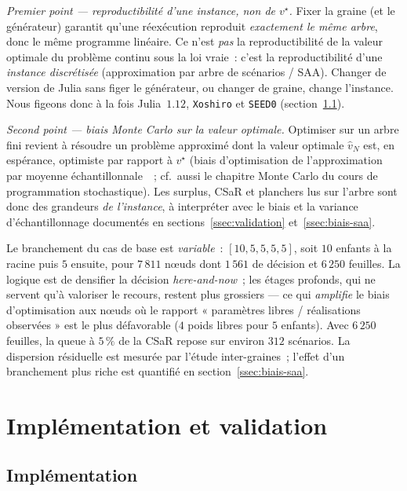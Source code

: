 \documentclass[11pt,letterpaper]{article}
\theoremstyle{definition}
\begin{document}
\emph{Premier point --- reproductibilité d'une instance, non de $v^\star$.}
Fixer la graine (et le générateur) garantit qu'une réexécution reproduit
\emph{exactement le même arbre}, donc le même programme linéaire. Ce n'est
\emph{pas} la reproductibilité de la valeur optimale du problème continu sous
la loi vraie~: c'est la reproductibilité d'une \emph{instance discrétisée}
(approximation par arbre de scénarios / SAA). Changer de version de Julia sans
figer le générateur, ou changer de graine, change l'instance. Nous figeons
donc à la fois Julia~$1.12$, \texttt{Xoshiro} et \texttt{SEED0}
(section~\ref{ssec:implementation-code}).

\emph{Second point --- biais Monte Carlo sur la valeur optimale.}
Optimiser sur un arbre fini revient à résoudre un problème approximé dont la
valeur optimale $\hat v_N$ est, en espérance, optimiste par rapport à
$v^\star$ (biais d'optimisation de l'approximation par moyenne
échantillonnale~\cite{Mak1999}~; cf.\ aussi le chapitre Monte Carlo du cours
de programmation stochastique). Les surplus, CSaR et planchers lus sur l'arbre
sont donc des grandeurs \emph{de l'instance}, à interpréter avec le biais et
la variance d'échantillonnage documentés en
sections~\ref{ssec:validation} et~\ref{ssec:biais-saa}.

Le branchement du cas de base est \emph{variable}~: $[10, 5, 5, 5, 5]$, soit
$10$ enfants à la racine puis $5$ ensuite, pour $7\,811$ n\oe uds dont
$1\,561$ de décision et $6\,250$ feuilles. La logique est de densifier la
décision \emph{here-and-now}~; les étages profonds, qui ne servent qu'à
valoriser le recours, restent plus grossiers --- ce qui \emph{amplifie} le
biais d'optimisation aux n\oe uds où le rapport « paramètres libres /
réalisations observées » est le plus défavorable ($4$ poids libres pour $5$
enfants). Avec $6\,250$ feuilles, la queue à $5\,\%$ de la CSaR repose sur
environ $312$ scénarios. La dispersion résiduelle est mesurée par l'étude
inter-graines~; l'effet d'un branchement plus riche est quantifié en
section~\ref{ssec:biais-saa}.

\section{Implémentation et validation}\label{sec:implementation}

\subsection{Implémentation}\label{ssec:implementation-code}
\end{document}
